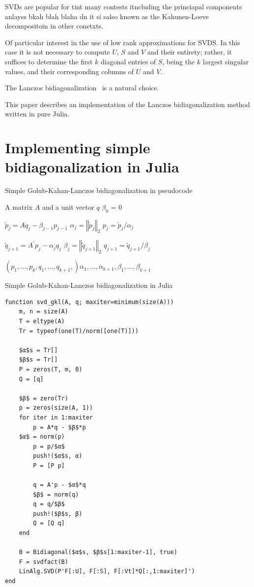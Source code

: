 \documentclass[final,leqno]{siamltex1213}
\begin{document}
SVDs are popular for tint many contests itncluding the princiapal
components anlayss bkah blah blaha dn it si salso known as the Kahunen-Loeve
decompositoin in other conetxts.

Of particular interest in the use of low rank approximations for SVDS.
In this case it is not necessary to compute $U$, $S$ and $V$ and
their entirety; rather, it suffices to determine the first $k$ diagonal
entries of $S$, being the $k$ largest singular values, and their
corresponding columns of $U$ and $V$.

The Lanczos bidiagonalization~\cite{Golub1965} is a natural choice.

This paper describes an implementation of the Lanczos bidiagonalization
method written in pure Julia.


\section{Implementing simple bidiagonalization in Julia}

\begin{algorithm}
\caption{Simple Golub-Kahan-Lanczos bidiagonalization in pseudocode}

\begin{algorithmic}
\REQUIRE A matrix $A$ and a unit vector $q$
\STATE $\beta_0$ = 0

\STATE $\tilde{p}_j = A q_j - \beta_{j-1} p_{j-1}$
\STATE $\alpha_j = \left\Vert \tilde{p}_j \right\Vert_2$
\STATE $p_j = \tilde{p}_j / \alpha_j$

\STATE $\tilde{q}_{j+1} = A^\prime p_j - \alpha_j q_j$
\STATE $\beta_j = \left\Vert \tilde{q}_{j+1} \right\Vert_2$
\STATE $q_{j+1} = \tilde{q}_{j+1} / \beta_j$

\ENDFOR
\RETURN $\left(p_1, \dots, p_k, q_1, \dots, q_{k+1},\right) \alpha_1, \dots, \alpha_{k+1}, \beta_1, \dots, \beta_{k+1}$
\end{algorithmic}
\end{algorithm}



\begin{algorithm}
\caption{Simple Golub-Kahan-Lanczos bidiagonalization in Julia}

\begin{lstlisting}
function svd_gkl(A, q; maxiter=minimum(size(A)))
    m, n = size(A)
    T = eltype(A)
    Tr = typeof(one(T)/norm([one(T)]))

    $α$s = Tr[]
    $β$s = Tr[]
    P = zeros(T, m, 0)
    Q = [q]

    $β$ = zero(Tr)
    p = zeros(size(A, 1))
    for iter in 1:maxiter
        p = A*q - $β$*p
	$α$ = norm(p)
        p = p/$α$
        push!($α$s, α)
        P = [P p]

        q = A'p - $α$*q
        $β$ = norm(q)
        q = q/$β$
        push!($β$s, β)
        Q = [Q q]
    end

    B = Bidiagonal($α$s, $β$s[1:maxiter-1], true)
    F = svdfact(B)
    LinAlg.SVD(P'F[:U], F[:S], F[:Vt]*Q[:,1:maxiter]')
end
\end{lstlisting}
\end{algorithm}
\end{document}
